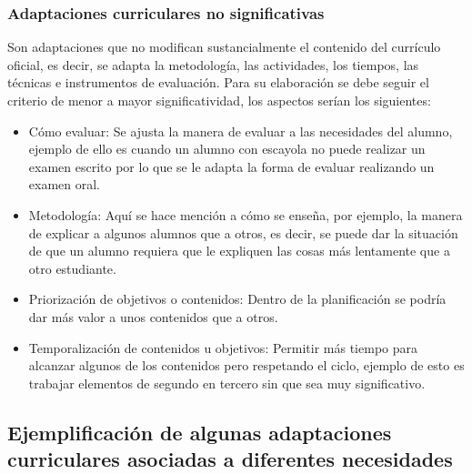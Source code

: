 \subsubsection{Adaptaciones curriculares no significativas}
Son adaptaciones que no modifican sustancialmente el contenido del currículo oficial, es decir, se adapta la metodología, las actividades, los tiempos, las técnicas e instrumentos de evaluación. Para su elaboración se debe  seguir el criterio de menor a mayor significatividad, los aspectos serían los siguientes:
\begin{itemize}
    \item Cómo evaluar: Se ajusta la manera de evaluar a las necesidades del alumno, ejemplo de ello es cuando un alumno con escayola no puede realizar un examen escrito por lo que se le adapta la forma de evaluar realizando un examen oral.
    \item Metodología: Aquí se hace mención a cómo se enseña, por ejemplo, la manera de explicar a algunos alumnos que a otros, es decir, se puede dar la situación de que un alumno requiera que le expliquen las cosas más lentamente que a otro estudiante.
    \item Priorización de objetivos o contenidos: Dentro de la planificación se podría dar más valor a unos contenidos que a otros.
    \item Temporalización de contenidos u objetivos: Permitir más tiempo para alcanzar algunos de los contenidos pero respetando el ciclo, ejemplo de esto es trabajar elementos de segundo en tercero sin que sea muy significativo.
\end{itemize}

\subsection{Ejemplificación de algunas adaptaciones curriculares asociadas a diferentes necesidades }

